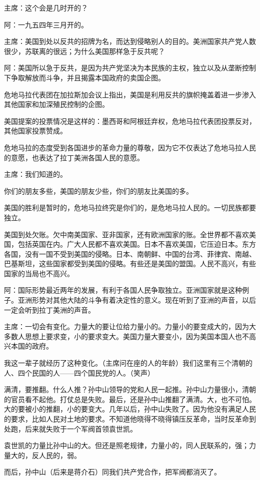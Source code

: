 主席：这个会是几时开的？

阿：一九五四年三月开的。

主席：美国到处以反共的招牌为名，而达到侵略别人的目的。美洲国家共产党人数很少，苏联离的很远；为什么美国那样急于反共呢？

阿：美国所以急于反共，是因为共产党坚决为本民族的主权，独立以及从垄断控制下争取解放而斗争，并且揭露本国政府的卖国企图。

危地马拉代表团在加拉斯加会议上指出，美国是利用反共的旗帜掩盖着进一步渗入其他国家和加深殖民控制的企图。

美国提案的投票情况是这样的：墨西哥和阿根廷弃权，危地马拉代表团投票反对，其他国家投票赞成。

危地马拉的态度受到各国进步的革命力量的尊敬，因为它不仅表达了危地马拉人民的意愿，也表达了拉丁美洲各国人民的意愿。

主席：我们知道的。

你们的朋友多些，美国的朋友少些，你们的朋友比美国的多。

美国的胜利是暂时的，危地马拉终究是你们的，是危地马拉人民的。一切民族都要独立。

美国到处欠账。欠中南美国家、亚非国家，还有欧洲国家的账。全世界都不喜欢美国，包括英国在内。广大人民都不喜欢美国。日本不喜欢美国，它压迫日本。东方各国，没有一国不受到美国的侵略。日本、南朝鲜、中国的台湾、菲律宾、南越、巴基斯坦，这些国家都受到美国的侵略。有些还是美国的盟国。人民不高兴，有些国家的当局也不高兴。

阿：国际形势最近两年的发展，有利于各国人民争取独立。亚洲国家就是这种例子。亚洲形势对其他大陆的斗争有着决定性的意义。现在听到了亚洲的声音，以后一定会听到拉丁美洲的声音。

主席：一切会有变化。力量大的要让位给力量小的。力量小的要变成大的，因为大多数人思想上要求变，小的要求变大。美国力量大要变小，因为美国本国人也不高兴本国的政府。

我这一辈子就经历了这种变化。（主席问在座的人的年龄）我们这里有三个清朝的人、四个民国的人——四个国民党的人。（笑声）

满清，要推翻。什么人推？孙中山领导的党和人民一起推。孙中山力量很小，清朝的官员看不起他。打仗总是失败。最后，还是孙中山推翻了满清。大，也不可怕。大的要被小的推翻，小的要变大。几年以后，孙中山失败了。因为他没有满足人民的要求，比如人民对土地的要求。不知道他晓得不晓得镇压反革命，当时反革命到处跑，后来就失败于一个军阀首领袁世凯。

袁世凯的力量比孙中山的大。但还是照老规律，力量小的，同人民联系的，强；力量大的，反人民的，弱。

而后，孙中山（后来是蒋介石）同我们共产党合作，把军阀都消灭了。

